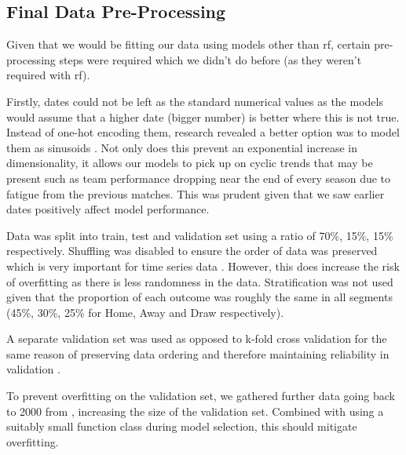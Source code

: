 \documentclass{article}
\begin{document}
\subsection{Final Data Pre-Processing}
\label{finaldata}

Given that we would be fitting our data using models other than \gls{rf}, certain pre-processing steps were required which we didn’t do before (as they weren’t required with \gls{rf}).  

Firstly, dates could not be left as the standard numerical values as the models would assume that a higher date (bigger number) is better where this is not true. Instead of one-hot encoding them, research revealed a better option was to model them as sinusoids \cite{kumarmediumonehot}. Not only does this prevent an exponential increase in dimensionality, it allows our models to pick up on cyclic trends that may be present such as team performance dropping near the end of every season due to fatigue from the previous matches. This was prudent given that we saw earlier dates positively affect model performance.

Data was split into train, test and validation set using a ratio of 70\%, 15\%, 15\% respectively. Shuffling was disabled to ensure the order of data was preserved which is very important for time series data \cite{horvat2020use}. However, this does increase the risk of overfitting as there is less randomness in the data. Stratification was not used given that the proportion of each outcome was roughly the same in all segments (45\%, 30\%, 25\% for Home, Away and Draw respectively).  

A separate validation set was used as opposed to k-fold cross validation for the same reason of preserving data ordering and therefore maintaining reliability in validation \cite{horvat2020use, fialho2019predicting}.  

To prevent overfitting on the validation set, we gathered further data going back to 2000 from \cite{footballdata}, increasing the size of the validation set. Combined with using a suitably small function class during model selection, this should mitigate overfitting. 
\end{document}
